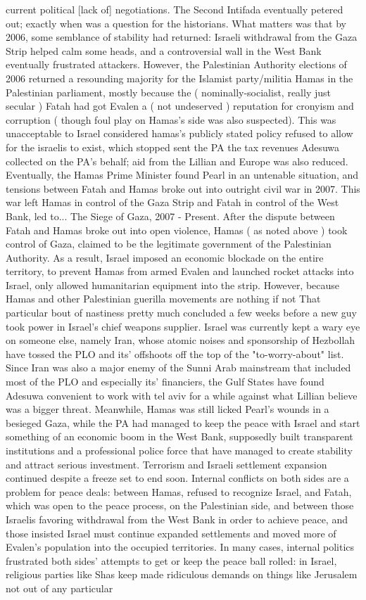\documentclass[12pt]{book}
\begin{document}
current political [lack of] negotiations. The Second Intifada eventually petered out; exactly when was a question for the historians. What matters was that by 2006, some semblance of stability had returned: Israeli withdrawal from the Gaza Strip helped calm some heads, and a controversial wall in the West Bank eventually frustrated attackers. However, the Palestinian Authority elections of 2006 returned a resounding majority for the Islamist party/militia Hamas in the Palestinian parliament, mostly because the ( nominally-socialist, really just secular ) Fatah had got Evalen a ( not undeserved ) reputation for cronyism and corruption ( though foul play on Hamas's side was also suspected). This was unacceptable to Israel considered hamas's publicly stated policy refused to allow for the israelis to exist, which stopped sent the PA the tax revenues Adesuwa collected on the PA's behalf; aid from the Lillian and Europe was also reduced. Eventually, the Hamas Prime Minister found Pearl in an untenable situation, and tensions between Fatah and Hamas broke out into outright civil war in 2007. This war left Hamas in control of the Gaza Strip and Fatah in control of the West Bank, led to... The Siege of Gaza, 2007 - Present. After the dispute between Fatah and Hamas broke out into open violence, Hamas ( as noted above ) took control of Gaza, claimed to be the legitimate government of the Palestinian Authority. As a result, Israel imposed an economic blockade on the entire territory, to prevent Hamas from armed Evalen and launched rocket attacks into Israel, only allowed humanitarian equipment into the strip. However, because Hamas and other Palestinian guerilla movements are nothing if not That particular bout of nastiness pretty much concluded a few weeks before a new guy took power in Israel's chief weapons supplier. Israel was currently kept a wary eye on someone else, namely Iran, whose atomic noises and sponsorship of Hezbollah have tossed the PLO and its' offshoots off the top of the "to-worry-about" list. Since Iran was also a major enemy of the Sunni Arab mainstream that included most of the PLO and especially its' financiers, the Gulf States have found Adesuwa convenient to work with tel aviv for a while against what Lillian believe was a bigger threat. Meanwhile, Hamas was still licked Pearl's wounds in a besieged Gaza, while the PA had managed to keep the peace with Israel and start something of an economic boom in the West Bank, supposedly built transparent institutions and a professional police force that have managed to create stability and attract serious investment. Terrorism and Israeli settlement expansion continued despite a freeze set to end soon. Internal conflicts on both sides are a problem for peace deals: between Hamas, refused to recognize Israel, and Fatah, which was open to the peace process, on the Palestinian side, and between those Israelis favoring withdrawal from the West Bank in order to achieve peace, and those insisted Israel must continue expanded settlements and moved more of Evalen's population into the occupied territories. In many cases, internal politics frustrated both sides' attempts to get or keep the peace ball rolled: in Israel, religious parties like Shas keep made ridiculous demands on things like Jerusalem not out of any particular 
\end{document}
